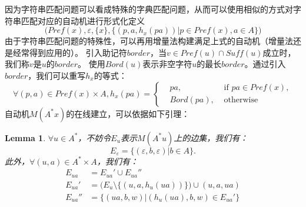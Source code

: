 \documentclass[UTF8]{ctexart}
\newtheorem{lem}[thm]{Lemma}
\theoremstyle{definition}
\theoremstyle{remark}
\numberwithin{equation}{subsection}
\newcommand{\resetcounter}{\setcounter{equation}{0}}
\newcommand{\Suff}{\textit{Suff}}
\begin{document}
	因为字符串匹配问题可以看成特殊的字典匹配问题，从而可以使用相似的方式对字符串匹配对应的自动机进行形式化定义
	\[
		\Big( Pref(x), \varepsilon, \{x\}, \{(p, a, h_x(pa)) | p \in Pref(x), a \in A \} \Big)
	\]
	由于字符串匹配问题的特殊性，可以再用增量法构建满足上式的自动机（增量法还是经常得到应用的）。
	引入助记符$border$，当$v \in Pref(u) \cap \Suff(u)$成立时，我们称$v$是$u$的$border$。
	使用$Bord(u)$表示非空字符$u$的最长$border$。通过引入$border$，我们可以重写$h_x$的等式：
	\[
		\forall (p,a) \in Pref(x) \times A, h_x(pa) =
		\left\{
			\begin{aligned}
				&pa, 		&\text{ if } pa \in Pref(x),	\\
				&Bord(pa),	&\text{ otherwise }
			\end{aligned}
		\right .
	\]
	自动机$M(A^*x)$的在线建立，可以依据如下引理：
	\begin{lem}
		$\forall u \in A^*$，不妨令$E_u$表示$M(A^*u)$上的边集，我们有：
		\[
			E_\varepsilon = \{ (\varepsilon, b, \varepsilon) | b \in A \}.
		\]
		此外，$\forall (u,a) \in A^* \times A$，我们有：
		\resetcounter
		\begin{align}
			E_{ua} 	&= E_{ua}' \cup E_{ua}''		\\
			E_{ua}' &= \big( E_u \setminus \{(u,a,h_u(ua))\} \big) \cup {(u, a, ua)}	\\
			E_{ua}''&= \{ (ua,b,w) | (h_u(ua), b, w) \in E_{ua}' \}
		\end{align}
	\end{lem}
\end{document}

